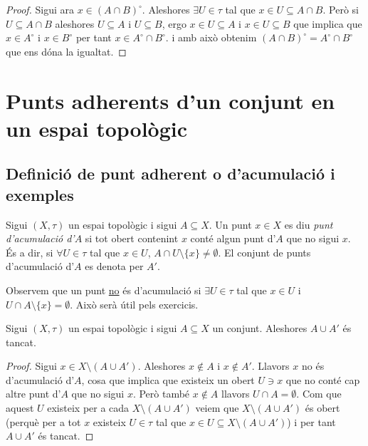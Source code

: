 \documentclass[../main.tex]{subfiles}
\begin{document}
\begin{proof}
Sigui ara $x\in (A\cap B)^\circ$. Aleshores $\exists U\in\tau$ tal que $x\in U\subseteq A\cap B$. Però si $U\subseteq A\cap B$ aleshores $U\subseteq A$ i $U\subseteq B$, ergo $x\in U\subseteq A$ i $x\in U\subseteq B$ que implica que $x\in A^\circ$ i $x\in B^\circ$ per tant $x\in A^\circ\cap B^\circ$.
i amb això obtenim $(A\cap B)^\circ = A^\circ\cap B^\circ$ que ens dóna la igualtat.
\end{proof}

\section{Punts adherents d'un conjunt en un espai topològic}
\subsection{Definició de punt adherent o d'acumulació i exemples}

\begin{defi}
[Acumulació]\label{def:acumulacio} Sigui $(X,\tau)$ un espai topològic i sigui $A\subseteq X$. Un punt $x\in X$ es diu \textit{punt d'acumulació d'$A$} si tot obert contenint $x$ conté algun punt d'$A$ que no sigui $x$. És a dir, si $\forall U\in\tau$ tal que $x\in U$, $A\cap U\setminus\{x\}\not=\emptyset$. El conjunt de punts d'acumulació d'$A$ es denota per $A'$.
\end{defi}

Observem que un punt \underline{no} és d'acumulació si $\exists U\in\tau$ tal que $x\in U$ i $U\cap A\setminus \{x\}=\emptyset$. Això serà útil pels exercicis.

\begin{prop}
\label{prop:acumulacio1} Sigui $(X,\tau)$ un espai topològic i sigui $A\subseteq X$ un conjunt. Aleshores $A\cup A'$ és tancat.
\end{prop}
\begin{proof}
Sigui $x\in X\setminus (A\cup A')$. Aleshores $x\not\in A$ i $x\not\in A'$. Llavors $x$ no és d'acumulació d'$A$, cosa que implica que existeix un obert $U\ni x$ que no conté cap altre punt d'$A$ que no sigui $x$. Però també $x\not\in A$ llavors $U\cap A = \emptyset$. Com que aquest $U$ existeix per a cada $X\setminus(A\cup A')$ veiem que $X\setminus (A\cup A')$ és obert (perquè per a tot $x$ existeix $U\in\tau$ tal que $x\in U\subseteq X\setminus(A\cup A')$) i per tant $A\cup A'$ és tancat.
\end{proof}
\end{document}
